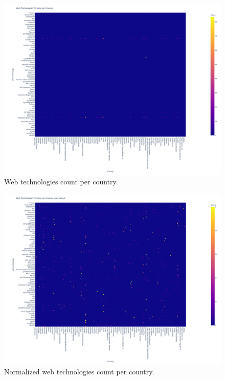 \begin{figure}[H]
  \centering
  \includegraphics[height=\textwidth, angle=90]{figures/charts/large/appendix/chart_fact_web_technology_heatmap_country.png}
  \caption{Web technologies count per country.}
  \label{fig:analysis-dataset-chart_fact_web_technology_heatmap_country}
\end{figure}

\begin{figure}[H]
  \centering
  \includegraphics[height=\textwidth, angle=90]{figures/charts/large/appendix/chart_fact_web_technology_heatmap_country_normalized.png}
  \caption{Normalized web technologies count per country.}
  \label{fig:analysis-dataset-chart_fact_web_technology_heatmap_country_normalized}
\end{figure}
